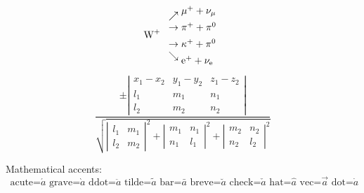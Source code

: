 \documentclass{article}
\begin{document}
\[
\mbox{W}^+\
\begin{array}{l}
\nearrow\raise5pt\hbox{$\mu^+ + \nu_{\mu}$}\\
\rightarrow         \pi^+ +\pi^0         \\[5pt]
\rightarrow \kappa^+ +\pi^0              \\
\searrow\lower5pt\hbox{$\mathrm{e}^+
          +\nu_{\scriptstyle\mathrm{e}}$}
\end{array}
\]

\[
\frac{\pm
\left|\begin{array}{ccc}
x_1-x_2  & y_1-y_2 & z_1-z_2 \\
l_1      & m_1     & n_1     \\
l_2      & m_2     & n_2
\end{array}\right|}{
\sqrt{\left|\begin{array}{cc}l_1&m_1\\
l_2&m_2\end{array}\right|^2
+     \left|\begin{array}{cc}m_1&n_1\\
n_1&l_1\end{array}\right|^2
+     \left|\begin{array}{cc}m_2&n_2\\
n_2&l_2\end{array}\right|^2}}
\]

Mathematical accents:
\[
\mbox{ acute=}\acute{a}
\mbox{ grave=}\grave{a}
\mbox{ ddot=}\ddot {a}
\mbox{ tilde=}\tilde{a}
\mbox{ bar=}\bar  {a}
\mbox{ breve=}\breve{a}
\mbox{ check=}\check{a}
\mbox{ hat=}\hat  {a}
\mbox{ vec=}\vec  {a}
\mbox{ dot=}\dot  {a}
\]
\end{document}
